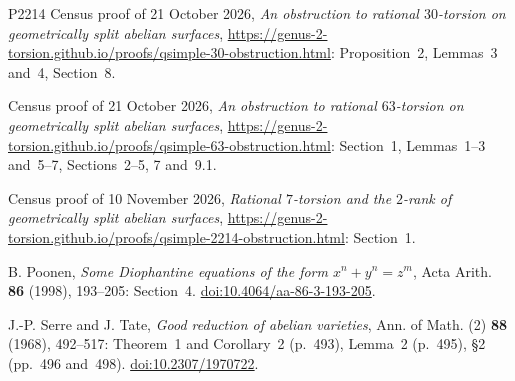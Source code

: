 \documentclass[11pt]{article}
\begin{document}
\begin{thebibliography}{P2214}
Census proof of 21 October 2026, \emph{An obstruction to rational \(30\)-torsion on geometrically
split abelian surfaces},
\url{https://genus-2-torsion.github.io/proofs/qsimple-30-obstruction.html}: Proposition~2,
Lemmas~3 and~4, Section~8.

Census proof of 21 October 2026, \emph{An obstruction to rational \(63\)-torsion on geometrically
split abelian surfaces},
\url{https://genus-2-torsion.github.io/proofs/qsimple-63-obstruction.html}: Section~1,
Lemmas~1--3 and~5--7, Sections~2--5, 7 and~9.1.

Census proof of 10 November 2026, \emph{Rational \(7\)-torsion and the \(2\)-rank of
geometrically split abelian surfaces},
\url{https://genus-2-torsion.github.io/proofs/qsimple-2214-obstruction.html}: Section~1.

B. Poonen, \emph{Some Diophantine equations of the form \(x^n+y^n=z^m\)}, Acta Arith. \textbf{86}
(1998), 193--205: Section~4.
\href{https://doi.org/10.4064/aa-86-3-193-205}{doi:10.4064/aa-86-3-193-205}.

J.-P. Serre and J. Tate, \emph{Good reduction of abelian varieties}, Ann. of Math. (2)
\textbf{88} (1968), 492--517: Theorem~1 and Corollary~2 (p.~493), Lemma~2 (p.~495), \S2
(pp.~496 and~498). \href{https://doi.org/10.2307/1970722}{doi:10.2307/1970722}.

\end{thebibliography}
\end{document}
